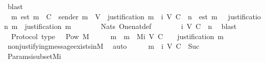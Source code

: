 \begin{isabellebody}
\ blast\isanewline
\ \ \isamarkupfalse%
\ \isamarkupfalse%
\ {\isachardoublequoteopen}{\isasymexists}\ m{\isachardot}\ est\ m\ {\isasymin}\ C\ {\isasymand}\ sender\ m\ {\isasymin}\ V\ {\isasymand}\ justification\ m\ {\isasymin}\ {\isasymSigma}{\isacharunderscore}i\ {\isacharparenleft}V{\isacharcomma}\ C{\isacharcomma}\ {\isasymepsilon}{\isacharparenright}\ n\ {\isasymand}\ est\ m\ {\isasymin}\ {\isasymepsilon}\ {\isacharparenleft}justification\ m{\isacharparenright}\ {\isasymand}\ justification\ m\ {\isacharequal}\ {\isasymsigma}{\isachardoublequoteclose}\isanewline
\ \ \ \ \isamarkupfalse%
\ Nats{\isacharunderscore}{}\ One{\isacharunderscore}nat{\isacharunderscore}def\isanewline
\ \ \ \ \isamarkupfalse%
\ {\isacartoucheopen}{\isasymsigma}\ {\isasymin}\ {\isasymSigma}{\isacharunderscore}i\ {\isacharparenleft}V{\isacharcomma}\ C{\isacharcomma}\ {\isasymepsilon}{\isacharparenright}\ n{\isacartoucheclose}\ \isamarkupfalse%
\ blast\isanewline
{}\isamarkupfalse%
%
\endisatagproof
{\isafoldproof}%
%
\isadelimproof
\isanewline
%
\endisadelimproof
\isanewline
{}\isamarkupfalse%
\ {\isacharparenleft}\ Protocol{\isacharparenright}\ {\isasymSigma}{\isacharunderscore}type{\isacharcolon}\ {\isachardoublequoteopen}{\isasymSigma}\ {\isasymsubset}\ Pow\ M{\isachardoublequoteclose}\isanewline
%
\isadelimproof
%
\endisadelimproof
%
\isatagproof
{}\isamarkupfalse%
\ {\isacharminus}\isanewline
\ \ \isamarkupfalse%
\ m\ \ {\isachardoublequoteopen}m\ {\isasymin}\ M{\isacharunderscore}i\ {\isacharparenleft}V{\isacharcomma}\ C{\isacharcomma}\ {\isasymepsilon}{\isacharparenright}\ {}\ {\isasymand}\ justification\ m\ {\isacharequal}\ {\isasymemptyset}{\isachardoublequoteclose}\isanewline
\ \ \ \ \isamarkupfalse%
\ non{\isacharunderscore}justifying{\isacharunderscore}message{\isacharunderscore}exists{\isacharunderscore}in{\isacharunderscore}M{\isacharunderscore}{}\ \isamarkupfalse%
\ auto\isanewline
\ \ \isamarkupfalse%
\ \isamarkupfalse%
\ {\isachardoublequoteopen}{\isacharbraceleft}m{\isacharbraceright}\ {\isasymin}\ {\isasymSigma}{\isacharunderscore}i\ {\isacharparenleft}V{\isacharcomma}\ C{\isacharcomma}\ {\isasymepsilon}{\isacharparenright}\ {\isacharparenleft}Suc\ {}{\isacharparenright}{\isachardoublequoteclose}\isanewline
\ \ \ \ \isamarkupfalse%
\ Params{\isachardot}{\isasymSigma}i{\isacharunderscore}subset{\isacharunderscore}Mi\ \isamarkupfalse%

\end{isabellebody}
